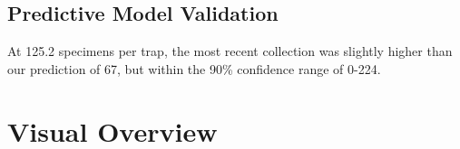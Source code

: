 \documentclass{article}
\begin{document}
\vspace{2mm}
\subsection*{Predictive Model Validation}


\begin{changemargin}{1.5cm}{1.5cm} 

At 125.2 specimens per trap, the most recent collection was slightly higher than our prediction of 67, but within the 90\% confidence range of 0-224.  

\end{changemargin}

\hrulefill


\fancyhfoffset[E,O]{0pt}


\section*{Visual Overview}
\hrulefill
\end{document}
